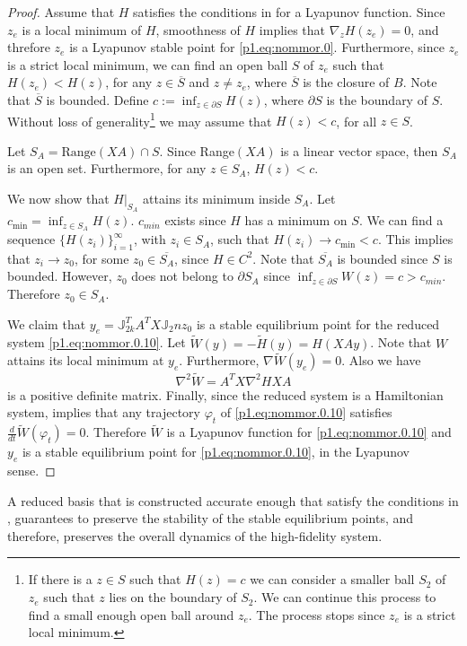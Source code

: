 {\begin{proof}
Assume that $H$ satisfies the conditions in  for a Lyapunov function. Since $z_e$ is a local minimum of $H$, smoothness of $H$ implies that $\nabla_z H(z_e) = 0$, and threfore $z_e$ is a Lyapunov stable point for \eqref{p1.eq:nommor.0}. Furthermore, since $z_e$ is a strict local minimum, we can find an open ball $S$ of $z_e$ such that $H(z_e)< H(z)$, for any $z \in \overline S$ and $z\neq z_e$, where $\overline S$ is the closure of $B$. Note that $\overline S$ is bounded. Define $c := \inf_{z\in \partial S} H(z)$, where $\partial S$ is the boundary of $S$. Without loss of generality\footnote{If there is a $z\in S$ such that $H(z) = c$ we can consider a smaller ball $S_2$ of $z_e$ such that $z$ lies on the boundary of $S_2$. We can continue this process to find a small enough open ball around $z_e$. The process stops since $z_e$ is a strict local minimum.} we may assume that $H(z)<c$, for all $z\in S$.

Let $S_A = \text{Range}(XA)\cap S$. Since Range$(XA)$ is a linear vector space, then $S_A$ is an open set. Furthermore, for any $z\in S_A$, $H(z) < c$. 
		
We now show that $H|_{S_A}$ attains its minimum inside $S_A$. Let $c_{\text{min}} = \inf_{z\in S_A} H(z)$. $c_{min}$ exists since $H$ has a minimum on $S$. We can find a sequence $\{ H(z_i) \}_{i=1}^\infty$, with $z_i\in S_A$, such that $H(z_i)\to c_{\text{min}} < c$. This implies that $z_i\to z_0$, for some $z_0\in \overline {S_A}$, since $H\in C^2$. Note that $\overline {S_A}$ is bounded since $S$ is bounded. However, $z_0$ does not belong to $\partial S_A$ since $\inf_{z\in \partial S} W(z)=c > c_{min}$. Therefore $z_0 \in S_A$. 

We claim that $y_e = \mathbb J_{2k}^T A^T X \mathbb J_2n z_0$ is a stable equilibrium point for the reduced system \eqref{p1.eq:nommor.0.10}. Let $\tilde W(y) = - \tilde H(y) = H(XAy)$. Note that $W$ attains its local minimum at $y_e$. Furthermore, $\nabla \tilde W(y_e) = 0$. Also we have
\begin{equation}
	\nabla^2 \tilde W = A^T X \nabla^2 H X A
\end{equation}
is a positive definite matrix. Finally, since the reduced system is a Hamiltonian system,  implies that any trajectory $\varphi_t$ of \eqref{p1.eq:nommor.0.10} satisfies $\frac{d}{dt} \tilde W(\varphi_t) = 0$. Therefore $\tilde W$ is a Lyapunov function for \eqref{p1.eq:nommor.0.10} and $y_e$ is a stable equilibrium point for \eqref{p1.eq:nommor.0.10}, in the Lyapunov sense.
\end{proof}

A reduced basis that is constructed accurate enough that satisfy the conditions in , guarantees to preserve the stability of the stable equilibrium points, and therefore, preserves the overall dynamics of the high-fidelity system.
}


